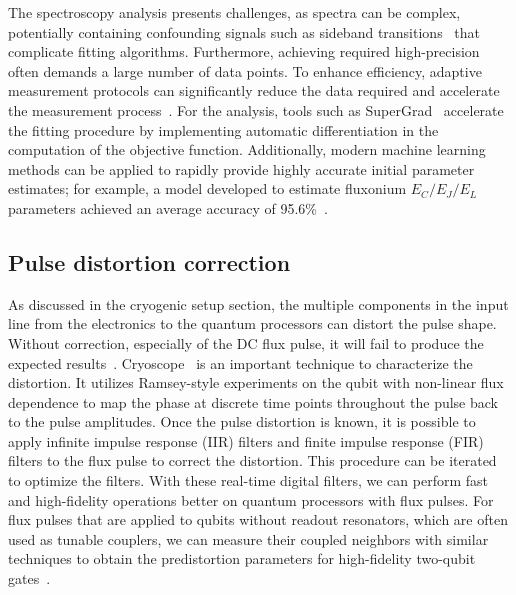 \documentclass[a4paper,onecolumn,11pt,unpublished]{quantumarticle}
\begin{document}
The spectroscopy analysis presents challenges, as spectra can be complex, potentially containing confounding signals such as sideband transitions~\cite{Wallraff2007Sideband} that complicate fitting algorithms. Furthermore, achieving required high-precision often demands a large number of data points. To enhance efficiency, adaptive measurement protocols can significantly reduce the data required and accelerate the measurement process~\cite{Nijholt2019textitAdaptive,Rol2016DiCarloLabDelftPycQEDpy3}. For the analysis, tools such as SuperGrad~\cite{Wang2025SuperGrad} accelerate the fitting procedure by implementing automatic differentiation in the computation of the objective function. Additionally, modern machine learning methods can be applied to rapidly provide highly accurate initial parameter estimates; for example, a model developed to estimate fluxonium $E_C/E_J/E_L$ parameters achieved an average accuracy of 95.6\%~\cite{Kung2025Automatic}.

\subsection{Pulse distortion correction}

As discussed in the cryogenic setup section, the multiple components in the input line from the electronics to the quantum processors can distort the pulse shape. Without correction, especially of the DC flux pulse, it will fail to produce the expected results~\cite{Rol2019Fast,Sung2021Realization}. Cryoscope~\cite{Rol2019Timedomain,Akesson2022Correcting} is an important technique to characterize the distortion. It utilizes Ramsey-style experiments on the qubit with non-linear flux dependence to map the phase at discrete time points throughout the pulse back to the pulse amplitudes. Once the pulse distortion is known, it is possible to apply infinite impulse response (IIR) filters and finite impulse response (FIR) filters to the flux pulse to correct the distortion. This procedure can be iterated to optimize the filters. With these real-time digital filters, we can perform fast and high-fidelity operations better on quantum processors with flux pulses. For flux pulses that are applied to qubits without readout resonators, which are often used as tunable couplers, we can measure their coupled neighbors with similar techniques to obtain the predistortion parameters for high-fidelity two-qubit gates~\cite{Li2025Highprecision}.
\end{document}
